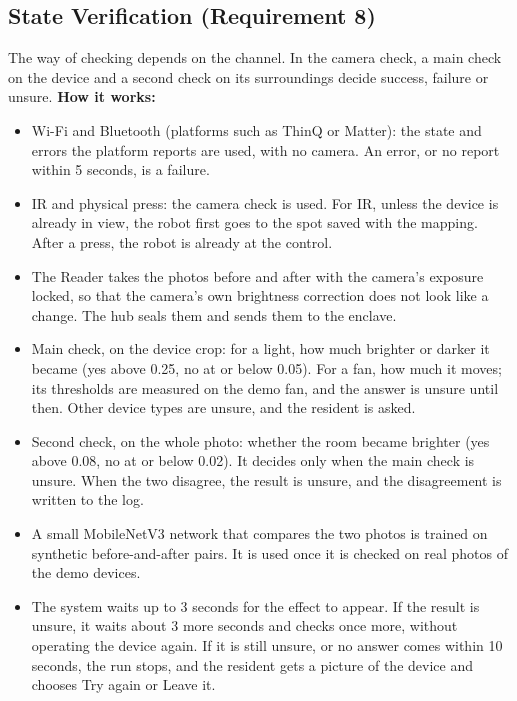 \documentclass[conference]{IEEEtran}
\begin{document}
\subsection{State Verification (Requirement 8)}
The way of checking depends on the channel. In the camera check, a main check on the device and a second check on its surroundings decide success, failure or unsure.
\textbf{How it works:}
\begin{itemize}
\item Wi-Fi and Bluetooth (platforms such as ThinQ or Matter): the state and errors the platform reports are used, with no camera. An error, or no report within 5 seconds, is a failure.
\item IR and physical press: the camera check is used. For IR, unless the device is already in view, the robot first goes to the spot saved with the mapping. After a press, the robot is already at the control.
\item The Reader takes the photos before and after with the camera's exposure locked, so that the camera's own brightness correction does not look like a change. The hub seals them and sends them to the enclave.
\item Main check, on the device crop: for a light, how much brighter or darker it became (yes above 0.25, no at or below 0.05). For a fan, how much it moves; its thresholds are measured on the demo fan, and the answer is unsure until then. Other device types are unsure, and the resident is asked.
\item Second check, on the whole photo: whether the room became brighter (yes above 0.08, no at or below 0.02). It decides only when the main check is unsure. When the two disagree, the result is unsure, and the disagreement is written to the log.
\item A small MobileNetV3 network that compares the two photos is trained on synthetic before-and-after pairs. It is used once it is checked on real photos of the demo devices.
\item The system waits up to 3 seconds for the effect to appear. If the result is unsure, it waits about 3 more seconds and checks once more, without operating the device again. If it is still unsure, or no answer comes within 10 seconds, the run stops, and the resident gets a picture of the device and chooses Try again or Leave it.
\end{itemize}
\end{document}
